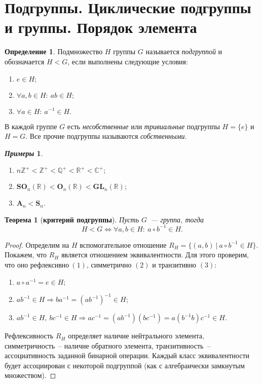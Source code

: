 \documentclass[a4paper, 14pt]{extarticle}
\newcommand{\n}{\par}
\newcommand{\integers}{\mathbb{Z}}
\newcommand{\rationals}{\mathbb{Q}}
\newcommand{\real}{\mathbb{R}}
\newcommand{\complex}{\mathbb{C}}
\newcommand{\GL}{\mathbf{GL}}
\newcommand{\Orth}{\mathbf{O}}
\newcommand{\SOrth}{\mathbf{SO}}
\newcommand{\symmetrical}{\mathbf{S}}
\newcommand{\alternating}{\mathbf{A}}
\theoremstyle{definition}
\newtheorem*{exmpls}{\textit{Примеры}}
\newtheorem{definition}{Определение}
\theoremstyle{plain}
\newtheorem*{theorem*}{Теорема}
\numberwithin{theorem}{section}
\numberwithin{definition}{section}
\numberwithin{statement}{section}
\numberwithin{lemma}{section}
\numberwithin{consequence}{section}
\begin{document}
	\section{Подгруппы. Циклические подгруппы и группы. Порядок элемента}
	\begin{definition}	
		Подмножество $H$ группы $G$ называется \textit{подгруппой} и обозначается $H < G$, если выполнены следующие условия:
		\begin{enumerate}
			\setlength\itemsep{0.1em}
			\item $e \in H;$
			\item $\forall a,b \in H{:} \ ab \in H;$
			\item $\forall a \in H{:} \ a^{-1} \in H.$
		\end{enumerate}
	\end{definition}
	В каждой группе $G$ есть \textit{несобственные} или \textit{тривиальные} подгруппы $H = \{e\}$ и $H = G$. Все прочие подгруппы называются \textit{собственными}.
	\begin{exmpls}
		\
		\begin{enumerate}
			\setlength\itemsep{0.1em}
			\item ${n\integers^ + < \integers ^ + < \rationals ^ + < \real ^ + < \complex ^ +;}$
			\item ${\SOrth_n(\real) < \Orth_n(\real) < \GL_n(\real);}$
			\item ${\alternating_n < \symmetrical_n.}$
		\end{enumerate}
	\end{exmpls}
	\begin{theorem*}[\textbf{критерий подгруппы}]
		Пусть $G$~--- группа, тогда
		\begin{equation*}
			H < G \Longleftrightarrow \forall a,b \in H{:} \ a \circ b^{-1} \in H.
		\end{equation*}
	\end{theorem*}
	\begin{proof}
		Определим на $H$ вспомогательное отношение ${R_H = \{(a,b)\ | \ a \circ b^{-1} \in H\}}.$ Покажем, что $R_H$ является отношением эквивалентности. Для этого проверим, что оно ${\text{рефлексивно} \ (1)}$, симметрично $(2)$ и транзитивно $(3)$:
		\begin{enumerate}
			\setlength\itemsep{0.1em}
			\item $a \circ a^{-1} = e \in H;$
			\item $ab^{-1} \in H \Longrightarrow b a^{-1} = (ab^{-1})^{-1} \in H;$
			\item $ab^{-1} \in H, \ bc^{-1} \in H \Longrightarrow ac^{-1} = (ab^{-1})(bc^{-1}) = a(b^{-1}b)c^{-1} \in H.$
		\end{enumerate} \n
		
		Рефлексивность $R_H$ определяет наличие нейтрального элемента, симметричность~-- наличие обратного элемента, транзитивность~-- ассоциативность заданной бинарной операции. Каждый класс эквивалентности будет ассоциирован с некоторой подгруппой (как с алгебраически замкнутым множеством). 
	\end{proof}
\end{document}
